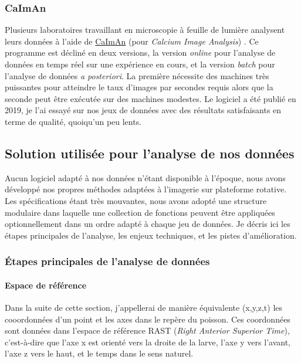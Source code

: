 \subsubsection{CaImAn}

Plusieurs laboratoires travaillant en microscopie à feuille de lumière analysent leurs données à l'aide de \href{https://github.com/flatironinstitute/CaImAn}{CaImAn} (pour \emph{Calcium Image Analysis}) \cite{giovannucci_caiman_2019}. Ce programme est décliné en deux versions, la version \emph{online} pour l'analyse de données en temps réel sur une expérience en cours, et la version \emph{batch} pour l'analyse de données \emph{a posteriori}. La première nécessite des machines très puissantes pour atteindre le taux d'images par secondes requis alors que la seconde peut être exécutée sur des machines modestes. Le logiciel a été publié en 2019, je l'ai essayé sur nos jeux de données avec des résultats satisfaisants en terme de qualité, quoiqu'un peu lents.

\subsection{Solution utilisée pour l'analyse de nos données}


Aucun logiciel adapté à nos données n'étant disponible à l'époque, nous avons développé nos propres méthodes adaptées à l'imagerie sur plateforme rotative. Les spécifications étant très mouvantes, nous avons adopté une structure modulaire dans laquelle une collection de fonctions peuvent être appliquées optionnellement dans un ordre adapté à chaque jeu de données. Je décris ici les étapes principales de l'analyse, les enjeux techniques, et les pistes d'amélioration.

\subsubsection{Étapes principales de l'analyse de données}

\paragraph{Espace de référence}

Dans la suite de cette section, j'appellerai de manière équivalente (x,y,z,t) les cooordonnées d'un point et les axes dans le repère du poisson. Ces coordonnées sont données dans l'espace de référence RAST (\emph{Right Anterior Superior Time}), c'est-à-dire que l'axe x est orienté vers la droite de la larve, l'axe y vers l'avant, l'axe z vers le haut, et le temps dans le sens naturel.

